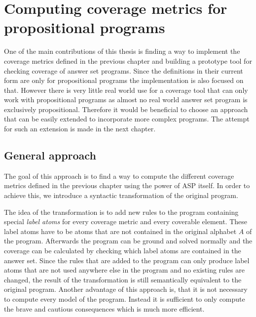 \chapter{Computing coverage metrics for propositional programs}
\label{ch:Computing coverage metrics for propositional programs}
One of the main contributions of this thesis is finding a way to implement the coverage metrics defined in the previous chapter and building a prototype tool for checking coverage of answer set programs. Since the definitions in their current form are only for propositional programs the implementation is also focused on that. However there is very little real world use for a coverage tool that can only work with propositional programs as almost no real world answer set program is exclusively propositional. Therefore it would be beneficial to choose an approach that can be easily extended to incorporate more complex programs. The attempt for such an extension is made in the next chapter.

\section{General approach}
\label{sec:Computing coverage metrics for propositional programs/General approach}
The goal of this approach is to find a way to compute the different coverage metrics defined in the previous chapter using the power of ASP itself. In order to achieve this, we introduce a syntactic transformation of the original program. 

The idea of the transformation is to add new rules to the program containing special \emph{label atoms} for every coverage metric and every coverable element. These label atoms have to be atoms that are not contained in the original alphabet $A$ of the program. Afterwards the program can be ground and solved normally and the coverage can be calculated by checking which label atoms are contained in the answer set. Since the rules that are added to the program can only produce label atoms that are not used anywhere else in the program and no existing rules are changed, the result of the transformation is still semantically equivalent to the original program. Another advantage of this approach is, that it is not necessary to compute every model of the program. Instead it is sufficient to only compute the brave and cautious consequences which is much more efficient.

